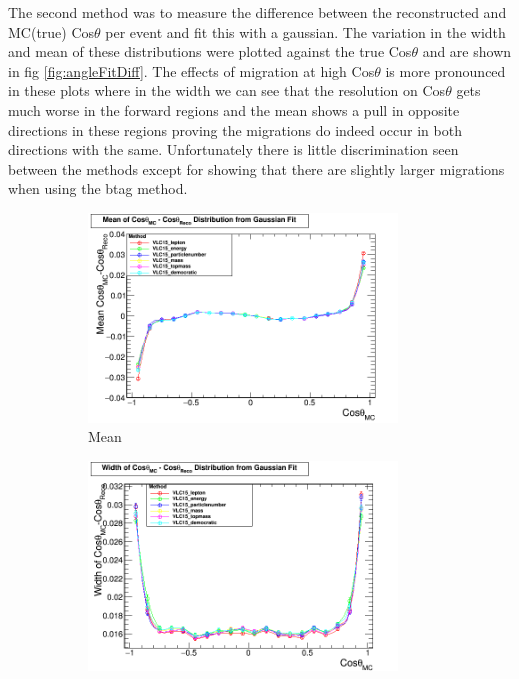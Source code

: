 The second method was to measure the difference between the reconstructed and MC(true) Cos$\theta$ per event and fit this with a gaussian. The variation in the width and mean of these distributions were plotted against the true Cos$\theta$ and are shown in fig \ref{fig:angleFitDiff}. The effects of migration at high Cos$\theta$ is more pronounced in these plots where in the width we can see that the resolution on Cos$\theta$ gets much worse in the forward regions and the mean shows a pull in opposite directions in these regions proving the migrations do indeed occur in both directions with the same. Unfortunately there is little discrimination seen between the methods except for showing that there are slightly larger migrations when using the btag method.

\begin{figure}
  \centering
  \begin{subfigure}{.5\textwidth}
    \centering
    \includegraphics[width=0.9\textwidth]{TopAnalysis/figures/MeanThetaDiff.png}
    \caption[Mean]{Mean}
  \end{subfigure}%
  \begin{subfigure}{.5\textwidth}
    \centering
    \includegraphics[width=0.9\textwidth]{TopAnalysis/figures/WidthThetaDiff.png}

\end{subfigure}
\end{figure}
